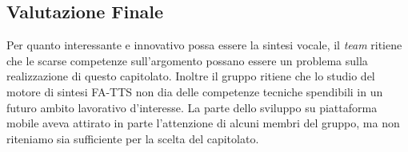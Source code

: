\subsection{Valutazione Finale}
Per quanto interessante e innovativo possa essere la sintesi vocale, il \textit{team} ritiene che le scarse competenze sull'argomento possano essere un problema sulla realizzazione di questo capitolato. Inoltre il gruppo ritiene che lo studio del motore di sintesi FA-TTS non dia delle competenze tecniche spendibili in un futuro ambito lavorativo d'interesse.
La parte dello sviluppo su piattaforma mobile aveva attirato in parte l'attenzione di alcuni membri del gruppo, ma non riteniamo sia sufficiente per la scelta del capitolato.
